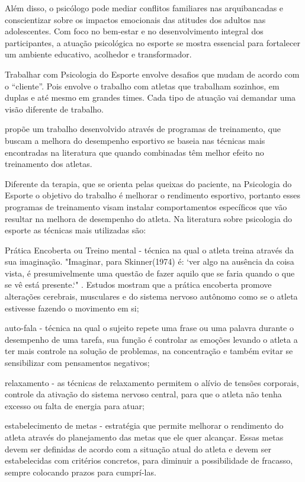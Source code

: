 \begin{Desenvolvimento}
Além disso, o psicólogo pode mediar conflitos familiares nas arquibancadas e conscientizar sobre os impactos emocionais das atitudes dos adultos nas adolescentes. Com foco no bem-estar e no desenvolvimento integral dos participantes, a atuação psicológica no esporte se mostra essencial para fortalecer um ambiente educativo, acolhedor e transformador.

Trabalhar com Psicologia do Esporte envolve desafios que mudam de acordo com o “cliente”.  Pois envolve o trabalho com atletas que trabalham sozinhos, em duplas e até mesmo em grandes times. Cada tipo de atuação vai demandar uma visão diferente de trabalho. 

 propõe um trabalho desenvolvido através de programas de treinamento, que buscam a melhora do desempenho esportivo se baseia nas técnicas mais encontradas na literatura que quando combinadas têm melhor efeito no treinamento dos atletas. 

Diferente da terapia, que se orienta pelas queixas do paciente, na Psicologia do Esporte o objetivo do trabalho é melhorar o rendimento esportivo, portanto esses programas de treinamento visam instalar comportamentos específicos que vão resultar na melhora  de desempenho do atleta. Na literatura sobre psicologia do esporte as técnicas mais utilizadas são:

\begin{alinea}
  \item Prática Encoberta ou Treino mental - técnica na qual o atleta treina através da sua imaginação. "Imaginar, para Skinner(1974) é: `ver algo na ausência da coisa vista, é presumivelmente uma questão de fazer aquilo que se faria quando o que se vê está presente.`" . Estudos mostram que a prática encoberta promove alterações cerebrais, musculares e do sistema nervoso autônomo como se o atleta estivesse fazendo o movimento em si;
  \item auto-fala - técnica na qual o sujeito repete uma frase ou uma palavra durante o desempenho de uma tarefa, sua função é controlar as emoções levando o atleta a ter mais controle na solução de problemas, na concentração e também evitar se sensibilizar com pensamentos negativos;
  \item relaxamento - as técnicas de relaxamento permitem o alívio de tensões corporais, controle da ativação do sistema nervoso central, para que o atleta não tenha excesso ou falta de energia para atuar;
  \item estabelecimento de metas -  estratégia que permite melhorar o rendimento do atleta através do planejamento das metas que ele quer alcançar. Essas metas devem ser definidas de acordo com a situação atual do atleta e devem ser estabelecidas com critérios concretos, para diminuir a possibilidade de fracasso, sempre colocando prazos para cumprí-las.
\end{alinea}


\end{Desenvolvimento}
